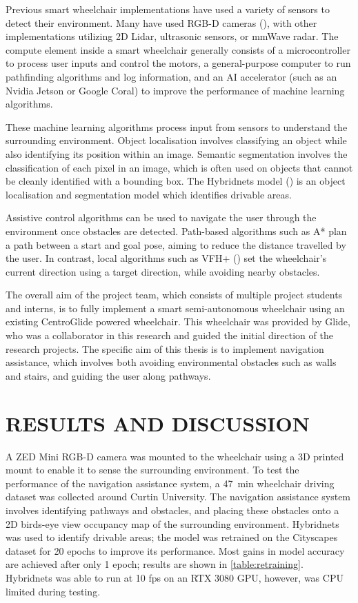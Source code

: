 \documentclass[10pt,twoside]{article}
\begin{document}
Previous smart wheelchair implementations have used a variety of sensors to detect their environment.
Many have used RGB-D cameras (\cite{wangS2P2SelfSupervisedGoalDirected2021}), with other implementations
utilizing 2D Lidar, ultrasonic sensors, or mmWave radar.
The compute element inside a smart wheelchair generally consists of a microcontroller to process user inputs and control the motors,
a general-purpose computer to run pathfinding algorithms and log information, and an AI accelerator (such as an Nvidia Jetson or Google Coral)
to improve the performance of machine learning algorithms.

These machine learning algorithms process input from sensors to understand the surrounding environment.
Object localisation involves classifying an object while also identifying its position within an image.
Semantic segmentation involves the classification of each pixel in an image, which is often used
on objects that cannot be cleanly identified with a bounding box.
The Hybridnets model (\cite{vuHybridNetsEndtoEndPerception2022}) is an object localisation and
segmentation model which identifies drivable areas.

Assistive control algorithms can be used to navigate the user through the environment once obstacles are detected.
Path-based algorithms such as A*
plan a path between a start and goal pose, aiming to reduce the distance travelled by the user.
In contrast, local algorithms such as VFH+ (\cite{ulrichVFHReliableObstacle1998})
set the wheelchair's current direction using a target direction, while avoiding nearby obstacles.

The overall aim of the project team, which consists of multiple project students and interns,
is to fully implement a smart semi-autonomous wheelchair
using an existing CentroGlide powered wheelchair. This wheelchair was provided
by Glide, who was a collaborator in this research and guided the initial direction of the
research projects.
The specific aim of this thesis is to implement navigation assistance,
which involves both avoiding environmental obstacles such as walls and stairs,
and guiding the user along pathways.

\section*{\textbf{RESULTS AND DISCUSSION}} %
A ZED Mini RGB-D camera was mounted to the wheelchair using a 3D printed mount to enable it to
sense the surrounding environment. To test the performance of the navigation
assistance system, a \SI{47}{\minute} wheelchair driving dataset was collected around
Curtin University.
The navigation assistance system involves identifying pathways and obstacles,
and placing these obstacles onto a 2D birds-eye view occupancy map of the
surrounding environment. Hybridnets was used to identify drivable
areas; the model was retrained on the Cityscapes dataset for 20 epochs to improve its performance.
Most gains in model accuracy are achieved after only 1 epoch; results are shown in \cref{table:retraining}.
Hybridnets was able to run at 10 fps on an RTX 3080 GPU, however, was CPU limited during testing.
\end{document}
